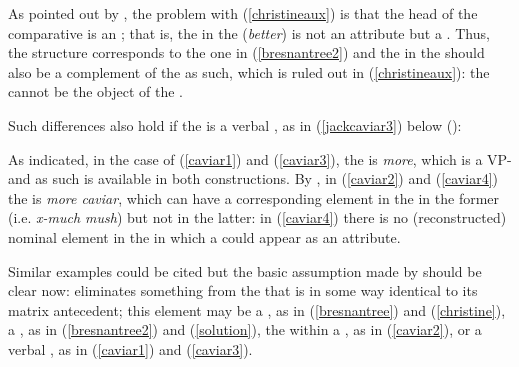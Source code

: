 \ea \label{christine}
 \label{christineaux}
\z
\z

As pointed out by \citet[320]{bresnan1973}, the problem with (\ref{christineaux}) is that the head of the comparative is an ; that is, the  in the  (\textit{better}) is not an attribute but a . Thus, the structure corresponds to the one in (\ref{bresnantree2}) and the  in the  should also be a complement of the  as such, which is ruled out in (\ref{christineaux}): the  cannot be the object of the .

Such differences also hold if the  is a verbal , as in (\ref{jackcaviar3}) below (\citealt[320, ex. 256]{bresnan1973}):

\ea \label{jackcaviar3}
 \label{caviar1}
 \label{caviar2}
 \label{caviar3}
 \label{caviar4}
\z
\z

As indicated, in the case of (\ref{caviar1}) and (\ref{caviar3}), the  is \textit{more}, which is a VP- and as such is available in both constructions. By , in (\ref{caviar2}) and (\ref{caviar4}) the  is \textit{more caviar}, which can have a corresponding element in the  in the former (i.e. \textit{x-much mush}) but not in the latter: in (\ref{caviar4}) there is no (reconstructed) nominal element in the  in which a  could appear as an attribute.

Similar examples could be cited but the basic assumption made by \citet{bresnan1973} should be clear now:  eliminates something from the  that is in some way identical to its matrix  antecedent; this element may be a  , as in (\ref{bresnantree}) and (\ref{christine}), a  , as in (\ref{bresnantree2}) and (\ref{solution}), the  within a  , as in (\ref{caviar2}), or a verbal , as in (\ref{caviar1}) and (\ref{caviar3}).

